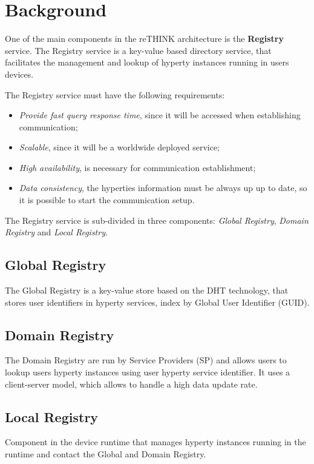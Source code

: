 \section{Background}
\label{section:background}
One of the main components in the reTHINK architecture is the \textbf{Registry} service.
The Registry service is a key-value based directory service, that facilitates the management and lookup of hyperty instances running in users devices.

The Registry service must have the following requirements:
\begin{itemize}
	\item \textit{Provide fast query response time}, since it will be accessed when establishing communication;
	\item \textit{Scalable}, since it will be a worldwide deployed service;
	\item \textit{High availability}, is necessary for communication establishment;
	\item \textit{Data consistency}, the hyperties information must be always up up to date, so it is possible to start the communication setup.
\end{itemize}

The Registry service is sub-divided in three components: \textit{Global Registry}, \textit{Domain Registry} and \textit{Local Registry}.

\subsection{Global Registry}
The Global Registry is a key-value store based on the DHT technology, that stores user identifiers in hyperty services, index by Global User Identifier (GUID).

\subsection{Domain Registry}
The Domain Registry are run by Service Providers (SP) and allows users to lookup users hyperty instances using user hyperty service identifier.
It uses a client-server model, which allows to handle a high data update rate.

\subsection{Local Registry}
Component in the device runtime that manages hyperty instances running in the runtime and contact the Global and Domain Registry.

